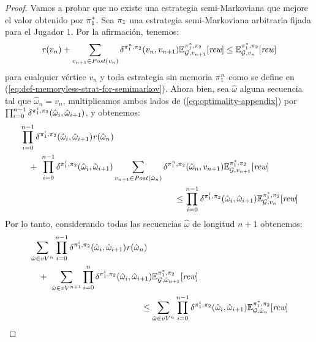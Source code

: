 \begin{proof}
Vamos a probar que no existe una estrategia semi-Markoviana que mejore el valor obtenido por $\pi^*_{1}$.  Sea $\pi_{1}$ una estrategia semi-Markoviana arbitraria fijada para el Jugador $1$.  Por la afirmación, tenemos:
  \begin{equation}\label{eq:optimality-appendix}
    \mathit{r}(v_n) + \sum_{v_{n+1} \in \mathit{Post}(v_n)} \delta^{\pi_{1}^n,\pi_{2}}(v_n, v_{n+1}) \mathbb{E}^{\pi^*_{1}, \pi_{2}}_{\mathcal{G},v_{n+1}}[\textit{rew}] \leq \mathbb{E}^{\pi^*_{1}, \pi_{2}}_{\mathcal{G},v_n}[\textit{rew}]
  \end{equation}
para cualquier vértice $v_n$ y toda estrategia sin memoria $\pi_{1}^n$ como se define en (\ref{eq:def-memoryless-strat-for-semimarkov}).  Ahora bien, sea $\hat{\omega}$ alguna secuencia tal que $\hat{\omega}_n = v_n$, multiplicamos ambos lados de (\ref{eq:optimality-appendix}) por $\prod^{n-1}_{i=0} \delta^{\pi_{1}^i,\pi_{2}}(\hat{\omega}_i,\hat{\omega}_{i+1})$, y obtenemos:
  \begin{align*}
    & \prod^{n-1}_{i=0}\delta^{\strat{1}^i, \strat{2}}(\hat{\omega}_i, \hat{\omega}_{i+1}) \reward(\hat{\omega}_n) \\
    & \quad + \ \prod^{n-1}_{i=0}\delta^{\strat{1}^i,\strat{2}}(\hat{\omega}_i, \hat{\omega}_{i+1}) \sum_{v_{n+1} \in \post(\hat{\omega}_n)}  \delta^{\strat{1}^n,\strat{2}}(\hat{\omega}_n, v_{n+1}) \Expect{\starredstrat{1}}{\strat{2}}_{\StochG,v_{n+1}}[\Rewards] \\
    & \hspace{18em} \leq 
    \prod^{n-1}_{i=0}\delta^{\strat{1}^i,\strat{2}}(\hat{\omega}_i,\hat{\omega}_{i+1}) \Expect{\starredstrat{1}}{\strat{2}}_{\StochG,v_n}[\Rewards]
  \end{align*}
Por lo tanto,  considerando todas las secuencias $\hat{\omega}$ de longitud $n+1$ obtenemos:
  \begin{align*}
    & \sum_{\hat{\omega} \in vV^{n}} \prod^{n-1}_{i=0}\delta^{\strat{1}^i,\strat{2}}(\hat{\omega}_i,  \hat{\omega}_{i+1}) \reward(\hat{\omega}_n) \\
    & \quad + \ \sum_{\hat{\omega} \in vV^{n+1}} \prod^{n}_{i=0}\delta^{\strat{1}^i,\strat{2}}(\hat{\omega}_i,\hat{\omega}_{i+1})  \Expect{\starredstrat{1}}{\strat{2}}_{\StochG,\hat{\omega}_{n+1}}[\Rewards]\\
    & \hspace{13em} \leq 
	\sum_{\hat{\omega} \in vV^{n}} \prod^{n-1}_{i=0}\delta^{\strat{1}^i,\strat{2}}(\hat{\omega}_i, \hat{\omega}_{i+1}) \Expect{\starredstrat{1}}{\strat{2}}_{\StochG,\hat{\omega}_n}[\Rewards]

\end{align*}
\end{proof}
